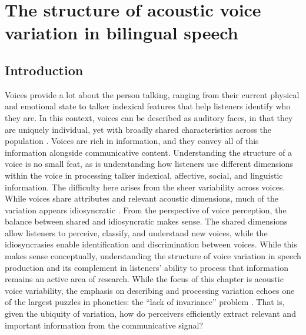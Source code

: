 \setcounter{chapter}{2}
\chapter{The structure of acoustic voice variation in bilingual speech}
\label{ch3:Voice}



\section{Introduction}\label{ch3:sec:introduction}
Voices provide a lot about the person talking, ranging from their current physical and emotional state to talker indexical features that help listeners identify who they are. In this context, voices can be described as auditory faces, in that they are uniquely individual, yet with broadly shared characteristics across the population \citep{belin_2004_voice}. Voices are rich in information, and they convey all of this information alongside communicative content. Understanding the structure of a voice is no small feat, as is understanding how listeners use different dimensions within the voice in processing talker indexical, affective, social, and linguistic information. The difficulty here arises from the sheer variability across voices. While voices share attributes and relevant acoustic dimensions, much of the variation appears idiosyncratic \citep{lee_2019_acoustic}. From the perspective of voice perception, the balance between shared and idiosyncratic makes sense. The shared dimensions allow listeners to perceive, classify, and understand new voices, while the idiosyncrasies enable identification and discrimination between voices. While this makes sense conceptually, understanding the structure of voice variation in speech production and its complement in listeners' ability to process that information remains an active area of research. While the focus of this chapter is acoustic voice variability, the emphasis on describing and processing variation echoes one of the largest puzzles in phonetics: the ``lack of invariance'' problem \citep{liberman_perception_1967}. That is, given the ubiquity of variation, how do perceivers efficiently extract relevant and important information from the communicative signal? 

